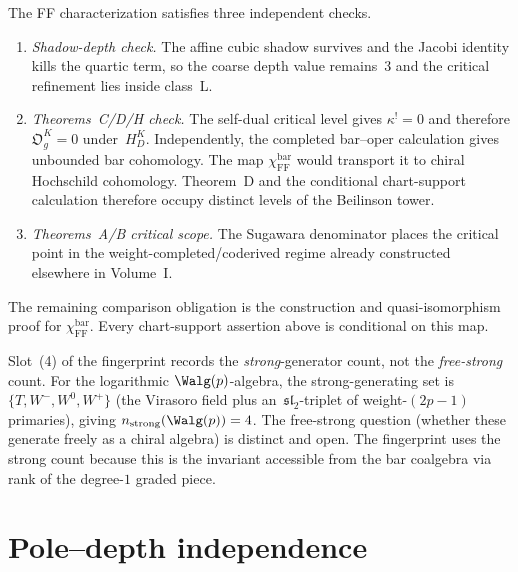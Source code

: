 \begin{remark}
\label{rem:ff-consistency-attacks}
The FF characterization satisfies three independent checks.
\begin{enumerate}[label=\textup{(\arabic*)},leftmargin=*]
\item \emph{Shadow-depth check.}
 The affine cubic shadow survives and the Jacobi identity kills the
 quartic term, so the coarse depth value remains~$3$ and the critical
 refinement lies inside class~L.
\item \emph{Theorems~C/D/H check.}
 The self-dual critical level gives $\kappa^!=0$ and therefore
 $\mathfrak O_g^K=0$ under~$H_D^K$. Independently, the completed bar--oper
 calculation gives unbounded bar cohomology. The map
 $\chi_{\mathrm{FF}}^{\mathrm{bar}}$ would transport it to chiral
 Hochschild cohomology. Theorem~D and the conditional chart-support
 calculation therefore occupy distinct levels of the Beilinson tower.
\item \emph{Theorems~A/B critical scope.}
 The Sugawara denominator places the critical point in the
 weight-completed/coderived regime already constructed elsewhere in
 Volume~I.
\end{enumerate}
The remaining comparison obligation is the construction and
quasi-isomorphism proof for $\chi_{\mathrm{FF}}^{\mathrm{bar}}$.
Every chart-support assertion above is conditional on this map.
\end{remark}

\begin{remark}
\label{rem:w-p-strong-generation}
Slot~(4) of the fingerprint records the \emph{strong}-generator
count, not the \emph{free-strong} count. For the logarithmic
$\Walg(p)$-algebra, the strong-generating set is $\{T, W^-, W^0, W^+\}$
(the Virasoro field plus an~$\mathfrak{sl}_2$-triplet of
weight-$(2p-1)$ primaries), giving $n_{\mathrm{strong}}(\Walg(p)) = 4$.
The free-strong question (whether these generate freely as a chiral
algebra) is distinct and open. The fingerprint uses the strong count
because this is the invariant accessible from the bar coalgebra
via rank of the degree-$1$ graded piece.
\end{remark}

\section{Pole--depth independence}
\label{sec:pole-depth-independence}


